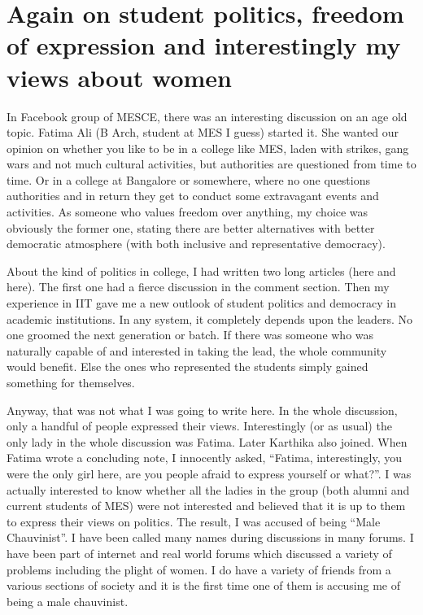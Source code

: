 \section*{Again on student politics, freedom of expression and interestingly my views about women}
\vskip 2pt

In Facebook group of MESCE, there was an interesting discussion on an age old topic. Fatima Ali (B Arch, student at MES I guess) started it. She wanted our opinion on whether you like to be in a college like MES, laden with strikes, gang wars and not much cultural activities, but authorities are questioned from time to time. Or in a college at Bangalore or somewhere, where no one questions authorities and in return they get to conduct some extravagant events and activities. As someone who values freedom over anything, my choice was obviously the former one, stating there are better alternatives with better democratic atmosphere (with both inclusive and representative democracy).

About the kind of politics in college, I had written two long articles (here and here). The first one had a fierce discussion in the comment section. Then my experience in IIT gave me a new outlook of student politics and democracy in academic institutions. In any system, it completely depends upon the leaders. No one groomed the next generation or batch. If there was someone who was naturally capable of and interested in taking the lead, the whole community would benefit. Else the ones who represented the students simply gained something for themselves.

Anyway, that was not what I was going to write here. In the whole discussion, only a handful of people expressed their views. Interestingly (or as usual) the only lady in the whole discussion was Fatima. Later Karthika also joined. When Fatima wrote a concluding note, I innocently asked, “Fatima, interestingly, you were the only girl here, are you people afraid to express yourself or what?”. I was actually interested to know whether all the ladies in the group (both alumni and current students of MES) were not interested and believed that it is up to them to express their views on politics. The result, I was accused of being “Male Chauvinist”. I have been called many names during discussions in many forums. I have been part of internet and real world forums which discussed a variety of problems including the plight of women. I do have a variety of friends from a various sections of society and it is the first time one of them is accusing me of being a male chauvinist.

